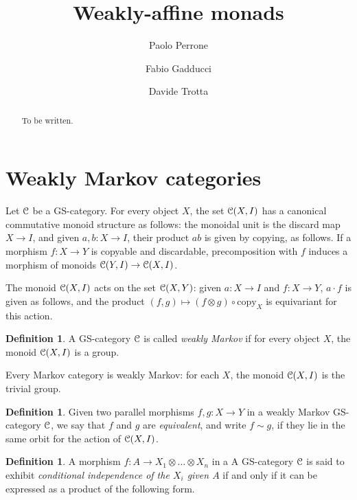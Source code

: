 \documentclass[a4paper,UKenglish,numberwithinsect,cleveref, autoref, thm-restate]{lipics-v2021}
\title{Weakly-affine monads}
\author{Paolo Perrone}{Department of Computer Science, University of Oxford}{paolo.perrone.math@gmail.com}{ }{}
\author{Fabio Gadducci}{Department of Computer Science, University of Pisa, Pisa, IT}{fabio.gadducci@unipi.it}{ https://orcid.org/
0000-0003-0690-3051}{}
\author{ Davide Trotta }{Department of Computer Science, University of Pisa, Pisa, IT}{trottadavide92@gmail.com}{https://orcid.org/0000-0003-4509-594X}{}
\theoremstyle{plain} %
\theoremstyle{definition} %
\newtheorem{mydefinition}[mytheorem]{Definition}
\begin{document}
\maketitle

\begin{abstract}
To be written.
\end{abstract}

\section{Weakly Markov categories}

Let $\mathcal{C}$ be a GS-category. For every object $X$, the set $\mathcal{C}(X,I)$ 
has a canonical commutative monoid structure as follows: the monoidal unit is the discard map $X\to I$, and given $a,b:X\to I$, their product $ab$ is given by copying, as follows.
If a morphism $f:X\to Y$ is copyable and discardable, precomposition with $f$ induces a morphism of monoids $\mathcal{C}(Y,I)\to\mathcal{C}(X,I)$. 

The monoid $\mathcal{C}(X,I)$ acts on the set $\mathcal{C}(X,Y)$: given $a:X\to I$ and $f:X\to Y$, $a\cdot f$ is given as follows,
and the product $(f,g)\mapsto (f\otimes g)\circ\mathrm{copy}_X$ is equivariant for this action. 

\begin{mydefinition}
 A GS-category $\mathcal{C}$ is called \emph{weakly Markov} if for every object $X$, the monoid $\mathcal{C}(X,I)$ is a group. 
\end{mydefinition}

Every Markov category is weakly Markov: for each $X$, the monoid $\mathcal{C}(X,I)$ is the trivial group.

\begin{mydefinition}
 Given two parallel morphisms $f,g:X\to Y$ in a weakly Markov GS-category $\mathcal{C}$, we say that $f$ and $g$ are \emph{equivalent}, and write $f\sim g$, if they lie in the same orbit for the action of $\mathcal{C}(X,I)$.
\end{mydefinition}

\begin{mydefinition}\label{defcondind}
 A morphism $f:A\to X_1\otimes\dots\otimes X_n$ in a A GS-category $\mathcal{C}$ is said to exhibit \emph{conditional independence of the $X_i$ given $A$} if and only if it can be expressed as a product of the following form.
\end{mydefinition}
\end{document}
